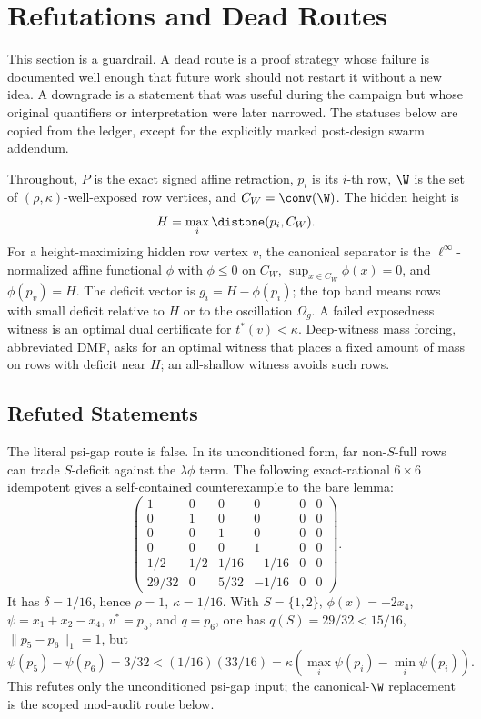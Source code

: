 \section{Refutations and Dead Routes}
\label{sec:refutations-dead-routes}

This section is a guardrail.  A dead route is a proof strategy whose failure is
documented well enough that future work should not restart it without a new idea.  A
downgrade is a statement that was useful during the campaign but whose original
quantifiers or interpretation were later narrowed.  The statuses below are copied from
the ledger, except for the explicitly marked post-design swarm addendum.

Throughout, \(P\) is the exact signed affine retraction, \(p_i\) is its \(i\)-th row,
\(\W\) is the set of \((\rho,\kappa)\)-well-exposed row vertices, and
\(C_W=\conv(\W)\).  The hidden height is
\[
  H=\max_i \distone(p_i,C_W).
\]
For a height-maximizing hidden row vertex \(v\), the canonical separator is the
\(\ell^\infty\)-normalized affine functional \(\phi\) with
\(\phi\le0\) on \(C_W\), \(\sup_{x\in C_W}\phi(x)=0\), and
\(\phi(p_v)=H\).  The deficit vector is
\(g_i=H-\phi(p_i)\); the top band means rows
with small deficit relative to \(H\) or to the oscillation \(\Omega_g\).  A failed
exposedness witness is an optimal dual certificate for \(t^*(v)<\kappa\).  Deep-witness
mass forcing, abbreviated DMF, asks for an optimal witness that places a fixed amount of
mass on rows with deficit near \(H\); an all-shallow witness avoids such rows.

\subsection{Refuted Statements}

\begin{refutedstatement}
 The literal psi-gap route is false.  In its unconditioned form, far
non-\(S\)-full rows can trade \(S\)-deficit against the \(\lambda\phi\) term.  The
following exact-rational \(6\times6\) idempotent gives a self-contained
counterexample to the bare lemma:
\[
\begin{pmatrix}
1&0&0&0&0&0\\
0&1&0&0&0&0\\
0&0&1&0&0&0\\
0&0&0&1&0&0\\
1/2&1/2&1/16&-1/16&0&0\\
29/32&0&5/32&-1/16&0&0
\end{pmatrix}.
\]
It has \(\delta=1/16\), hence \(\rho=1\), \(\kappa=1/16\).  With
\(S=\{1,2\}\), \(\phi(x)=-2x_4\), \(\psi=x_1+x_2-x_4\),
\(v^*=p_5\), and \(q=p_6\), one has
\(q(S)=29/32<15/16\), \(\|p_5-p_6\|_1=1\), but
\[
  \psi(p_5)-\psi(p_6)=3/32
  <(1/16)(33/16)=\kappa(\max_i\psi(p_i)-\min_i\psi(p_i)).
\]
This refutes only the unconditioned psi-gap input; the canonical-\(\W\)
replacement is the scoped mod-audit route below.
\end{refutedstatement}

